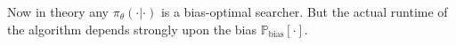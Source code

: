 \documentclass{article}
\newcommand{\probability}{\mathds{P}} %
\theoremstyle{definition}
\begin{document}
Now in theory any $\pi_\theta(\cdot |\cdot ) $ is a bias-optimal searcher.
But the actual runtime of the algorithm depends strongly upon
the bias $\probability_{\text{bias}}[\cdot ]$.
\end{document}
